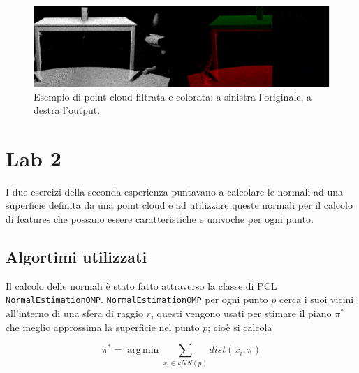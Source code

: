 \documentclass[a4paper]{article}
\DeclareMathOperator*{\argmin}{arg\,min}
\begin{document}
	\begin{figure}
		\centering
		\includegraphics[width=1\textwidth]{images/lab1.png}
		\caption{\label{fig:lab1}Esempio di point cloud filtrata e colorata: a sinistra l'originale, a destra l'output.}
	\end{figure}


\section{Lab 2} \label{sec:lab2}
I due esercizi della seconda esperienza puntavano a calcolare le normali ad una superficie definita da una point cloud e ad utilizzare queste normali per il calcolo di features che possano essere caratteristiche e univoche per ogni punto.

	\subsection{Algortimi utilizzati}
	Il calcolo delle normali è stato fatto attraverso la classe di PCL \verb|NormalEstimationOMP|. \verb|NormalEstimationOMP| per ogni punto $p$ cerca i suoi vicini all'interno di una sfera di raggio $r$, questi vengono usati per stimare il piano $\pi^*$ che meglio approssima la superficie nel punto $p$; cioè si calcola 
	
	\begin{equation}
	\pi^* = \argmin{\sum_{x_i \in kNN(p)}{dist(x_i,\pi)}}
	\end{equation}
	
\end{document}
